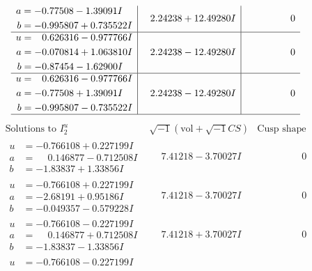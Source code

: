 \documentclass[1p]{elsarticle_modified}
\theoremstyle{definition}
\newcommand{\I}{\sqrt{-1}}
\begin{document}
$$\begin{array}{c|c|c}
\begin{aligned}
a &= -0.77508 - 1.39091 I \\
b &= -0.995807 + 0.735522 I\end{aligned}
 & \phantom{-}2.24238 + 12.49280 I & \phantom{-0.000000 } 0 \\ \hline\begin{aligned}
u &= \phantom{-}0.626316 - 0.977766 I \\
a &= -0.070814 + 1.063810 I \\
b &= -0.87454 - 1.62900 I\end{aligned}
 & \phantom{-}2.24238 - 12.49280 I & \phantom{-0.000000 } 0 \\ \hline\begin{aligned}
u &= \phantom{-}0.626316 - 0.977766 I \\
a &= -0.77508 + 1.39091 I \\
b &= -0.995807 - 0.735522 I\end{aligned}
 & \phantom{-}2.24238 - 12.49280 I & \phantom{-0.000000 } 0\\
 \hline 
 \end{array}$$\newpage$$\begin{array}{c|c|c}  
\text{Solutions to }I^u_{2}& \I (\text{vol} + \sqrt{-1}CS) & \text{Cusp shape}\\
 \hline 
\begin{aligned}
u &= -0.766108 + 0.227199 I \\
a &= \phantom{-}0.146877 - 0.712508 I \\
b &= -1.83837 + 1.33856 I\end{aligned}
 & \phantom{-}7.41218 - 3.70027 I & \phantom{-0.000000 } 0 \\ \hline\begin{aligned}
u &= -0.766108 + 0.227199 I \\
a &= -2.68191 + 0.95186 I \\
b &= -0.049357 - 0.579228 I\end{aligned}
 & \phantom{-}7.41218 - 3.70027 I & \phantom{-0.000000 } 0 \\ \hline\begin{aligned}
u &= -0.766108 - 0.227199 I \\
a &= \phantom{-}0.146877 + 0.712508 I \\
b &= -1.83837 - 1.33856 I\end{aligned}
 & \phantom{-}7.41218 + 3.70027 I & \phantom{-0.000000 } 0 \\ \hline\begin{aligned}
u &= -0.766108 - 0.227199 I \\

\end{aligned}
\end{array}$$
\end{document}
